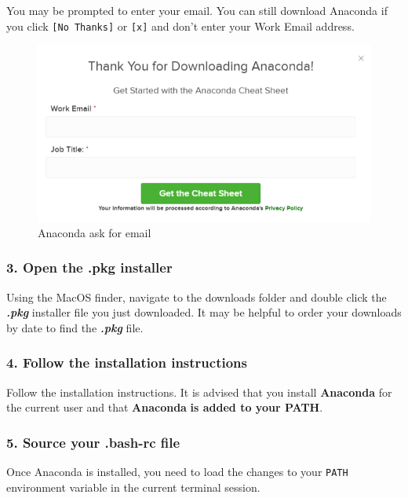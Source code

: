 \documentclass{book}
\makeatletter
\def\maxwidth{\ifdim\Gin@nat@width>\linewidth\linewidth
    \else\Gin@nat@width\fi}
\let\Oldincludegraphics\includegraphics
\renewcommand{\includegraphics}[1]{\Oldincludegraphics[width=.8\maxwidth]{#1}}
\makeatother
\begin{document}
You may be prompted to enter your email. You can still download Anaconda
if you click \lstinline![No Thanks]! or \lstinline![x]! and don't enter
your Work Email address.

\begin{figure}
\centering
\includegraphics{images/anaconda_download_mac_ask_for_email.png}
\caption{Anaconda ask for email}
\end{figure}

    \subsubsection{3. Open the .pkg
installer}\label{open-the-.pkg-installer}

Using the MacOS finder, navigate to the downloads folder and double
click the \textbf{\emph{.pkg}} installer file you just downloaded. It
may be helpful to order your downloads by date to find the
\textbf{\emph{.pkg}} file.

    \subsubsection{4. Follow the installation
instructions}\label{follow-the-installation-instructions}

Follow the installation instructions. It is advised that you install
\textbf{Anaconda} for the current user and that \textbf{Anaconda}
\textbf{is added to your PATH}.

    \subsubsection{5. Source your .bash-rc
file}\label{source-your-.bash-rc-file}

Once Anaconda is installed, you need to load the changes to your
\lstinline!PATH! environment variable in the current terminal session.
\end{document}
